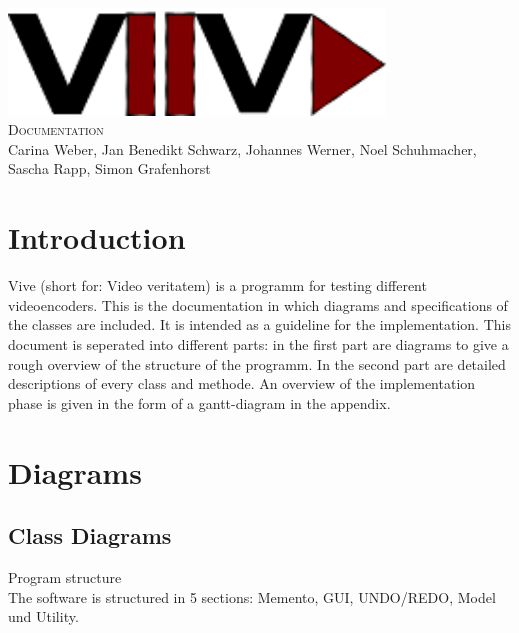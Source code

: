 \documentclass[twoside]{book}
\newcommand{\+}{\discretionary{\mbox{\scriptsize$\hookleftarrow$}}{}{}}
\newcommand{\clearemptydoublepage}{%
  \newpage{\pagestyle{empty}\cleardoublepage}%
}
\begin{document}
\hypersetup{pageanchor=false,
             bookmarks=true,
             bookmarksnumbered=true,
             pdfencoding=unicode
            }
\begin{titlepage}
\vspace*{7cm}
\begin{center}%
{\centering\includegraphics[width=10cm]{Logo.png}}\\
\vspace*{2cm}
\fontsize{40}{48} \selectfont \textsc{Documentation}\\
\vspace*{1cm}
\vspace*{0.5cm}
{\small Carina Weber, Jan Benedikt Schwarz, Johannes Werner, Noel Schuhmacher, Sascha Rapp, Simon Grafenhorst}\\
\end{center}
\end{titlepage}
\clearemptydoublepage
\tableofcontents
{}
\hypersetup{pageanchor=true}

\chapter{Introduction}
Vive (short for: Video veritatem) is a programm for testing different videoencoders. This is the documentation in which diagrams and specifications of the classes are included. It is intended as a guideline for the implementation.
This document is seperated into different parts: in the first part are diagrams to give a rough overview of the structure of the programm. In the second part are detailed descriptions of every class and methode. An overview of the implementation phase is given in the form of a gantt-diagram in the appendix.
\chapter{Diagrams}
\section{Class Diagrams}
Program structure\\
The software is structured in 5 sections: Memento, GUI, UNDO/REDO, Model und Utility.    
\end{document}
